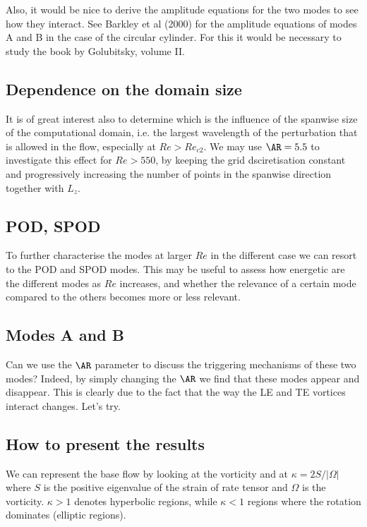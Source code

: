 \documentclass[onecolumn,notitlepage,superscriptaddress, amsmath,amssymb,longbibliographyaps,floatfix]{revtex4-1}
\begin{document}
Also, it would be nice to derive the amplitude equations for the two modes to see how they interact. See Barkley et al (2000) for the amplitude equations of modes A and B in the case of the circular cylinder. For this it would be necessary to study the book by Golubitsky, volume II.


\subsection{Dependence on the domain size}

It is of great interest also to determine which is the influence of the spanwise size of the computational domain, i.e. the largest wavelength of the perturbation that is allowed in the flow, especially at $Re>Re_{c2}$. We may use $\AR=5.5$ to investigate this effect for $Re>550$, by keeping the grid dsciretisation constant and progressively increasing the number of points in the spanwise direction together with $L_z$.

\subsection{POD, SPOD}

To further characterise the modes at larger $Re$ in the different case we can resort to the POD and SPOD modes. This may be useful to assess how energetic are the different modes as $Re$ increases, and whether the relevance of a certain mode compared to the others becomes more or less relevant.

\subsection{Modes A and B}

Can we use the $\AR$ parameter to discuss the triggering mechanisms of these two modes? Indeed, by simply changing the $\AR$ we find that these modes appear and disappear. This is clearly due to the fact that the way the LE and TE vortices interact changes. Let's try.

\subsection{How to present the results}

We can represent the base flow by looking at the vorticity and at $\kappa = 2S/|\Omega|$ where $S$ is the positive eigenvalue of the strain of rate tensor and $\Omega$ is the vorticity. $\kappa>1$ denotes hyperbolic regions, while $\kappa<1$ regions where the rotation dominates (elliptic regions).
\end{document}
